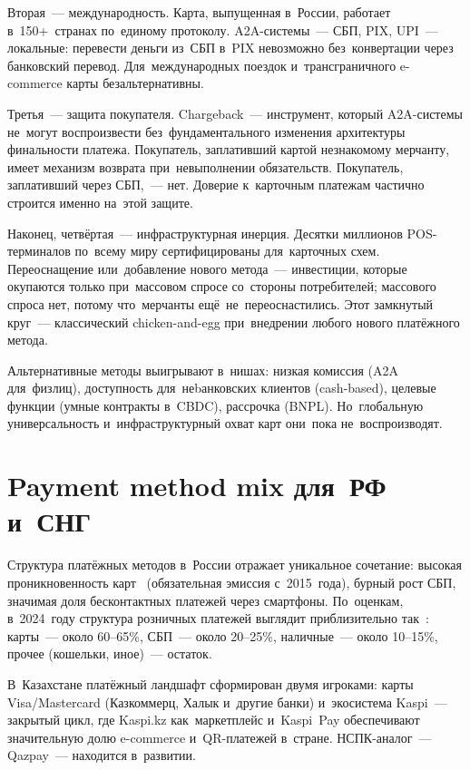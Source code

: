 Вторая~--- международность. Карта, выпущенная в~России, работает в~150+~странах
по~единому протоколу. A2A-системы~--- СБП, PIX, UPI~--- локальные: перевести
деньги из~СБП в~PIX невозможно без~конвертации через банковский перевод.
Для~международных поездок и~трансграничного e-commerce карты безальтернативны.

Третья~--- защита покупателя. Chargeback~--- инструмент, который A2A-системы
не~могут воспроизвести без~фундаментального изменения архитектуры финальности
платежа. Покупатель, заплативший картой незнакомому мерчанту, имеет
механизм возврата при~невыполнении обязательств. Покупатель, заплативший
через СБП,~--- нет. Доверие к~карточным платежам частично строится
именно на~этой защите.

Наконец, четвёртая~--- инфраструктурная инерция. Десятки миллионов POS-терминалов
по~всему миру сертифицированы для~карточных схем. Переоснащение или~добавление
нового метода~--- инвестиции, которые окупаются только при~массовом
спросе со~стороны потребителей; массового спроса нет, потому что~мерчанты
ещё~не~переоснастились. Этот замкнутый круг~--- классический chicken-and-egg
при~внедрении любого нового платёжного метода.

Альтернативные методы выигрывают в~нишах: низкая комиссия (A2A для~физлиц),
доступность для~неbанковских клиентов (cash-based), целевые функции (умные
контракты в~CBDC), рассрочка (BNPL). Но~глобальную универсальность
и~инфраструктурный охват карт они~пока не~воспроизводят.


\section{Payment method mix для~РФ и~СНГ}
\label{sec:alt-mix}

Структура платёжных методов в~России отражает уникальное сочетание:
высокая проникновенность карт~ (обязательная эмиссия с~2015~года),
бурный рост СБП, значимая доля бесконтактных платежей через смартфоны.
По~оценкам, в~2024~году структура розничных платежей выглядит
приблизительно так~: карты~--- около 60--65\%, СБП~--- около 20--25\%,
наличные~--- около 10--15\%, прочее (кошельки, иное)~--- остаток.

В~Казахстане платёжный ландшафт сформирован двумя игроками:
карты Visa/Mastercard (Казкоммерц, Халык и~другие банки) и~экосистема
Kaspi~--- закрытый цикл, где Kaspi.kz как~маркетплейс и~Kaspi~Pay
обеспечивают значительную долю e-commerce и~QR-платежей в~стране.
НСПК-аналог~--- Qazpay~--- находится в~развитии.

